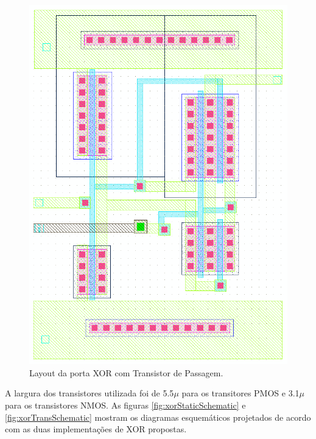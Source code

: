 \documentclass[a4paper,10pt] {article}
\begin{document}
\begin{figure}[h]
\begin{minipage} [b] {0.48 \linewidth}
	\includegraphics[scale=0.2]{xorTransGatelayout.png}
	\caption{Layout da porta XOR com Transistor de Passagem.}
	\label{fig:xorTransLayout}
  \end{minipage}
\end{figure}

A largura dos transistores utilizada foi de 5.5$\mu$ para os transitores PMOS e 3.1$\mu$ para os transistores NMOS.
As figuras \ref{fig:xorStaticSchematic} e \ref{fig:xorTransSchematic} mostram os diagramas esquemáticos projetados de acordo com as duas implementações de XOR propostas.
\end{document}
